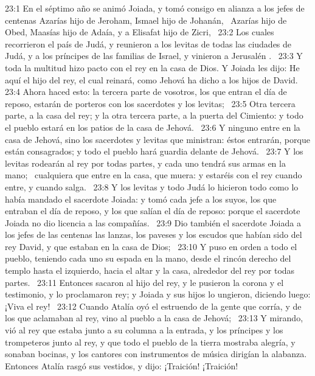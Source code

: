 																							23:1 En el séptimo año se animó Joiada, y tomó consigo en alianza a los jefes de centenas Azarías hijo de Jeroham, Ismael hijo de Johanán,  Azarías hijo de Obed, Maasías hijo de Adaía, y a Elisafat hijo de Zicri,  
																							23:2 Los cuales recorrieron el país de Judá, y reunieron a los levitas de todas las ciudades de Judá, y a los príncipes de las familias de Israel, y vinieron a Jerusalén .  
																							23:3 Y toda la multitud hizo pacto con el rey en la casa de Dios. Y Joiada les dijo: He aquí el hijo del rey, el cual reinará, como Jehová ha dicho a los hijos de David.  
																							23:4 Ahora haced esto: la tercera parte de vosotros, los que entran el día de reposo, estarán de porteros con los sacerdotes y los levitas;  
																							23:5 Otra tercera parte, a la casa del rey; y la otra tercera parte, a la puerta del Cimiento: y todo el pueblo estará en los patios de la casa de Jehová.  
																							23:6 Y ninguno entre en la casa de Jehová, sino los sacerdotes y levitas que ministran: éstos entrarán, porque están consagrados; y todo el pueblo hará guardia delante de Jehová.  
																							23:7 Y los levitas rodearán al rey por todas partes, y cada uno tendrá sus armas en la mano;  cualquiera que entre en la casa, que muera: y estaréis con el rey cuando entre, y cuando salga.  
																							23:8 Y los levitas y todo Judá lo hicieron todo como lo había mandado el sacerdote Joiada: y tomó cada jefe a los suyos, los que entraban el día de reposo, y los que salían el día de reposo: porque el sacerdote Joiada no dio licencia a las compañías.  
																							23:9 Dio también el sacerdote Joiada a los jefes de las centenas las lanzas, los paveses y los escudos que habían sido del rey David, y que estaban en la casa de Dios;  
																							23:10 Y puso en orden a todo el pueblo, teniendo cada uno su espada en la mano, desde el rincón derecho del templo hasta el izquierdo, hacia el altar y la casa, alrededor del rey por todas partes.  
																							23:11 Entonces sacaron al hijo del rey, y le pusieron la corona y el testimonio, y lo proclamaron rey; y Joiada y sus hijos lo ungieron, diciendo luego: ¡Viva el rey!  
																							23:12 Cuando Atalía oyó el estruendo de la gente que corría, y de los que aclamaban al rey, vino al pueblo a la casa de Jehová;  
																							23:13 Y mirando, vió al rey que estaba junto a su columna a la entrada, y los príncipes y los trompeteros junto al rey, y que todo el pueblo de la tierra mostraba alegría, y sonaban bocinas, y los cantores con instrumentos de música dirigían la alabanza. Entonces Atalía rasgó sus vestidos, y dijo: ¡Traición! ¡Traición!  
